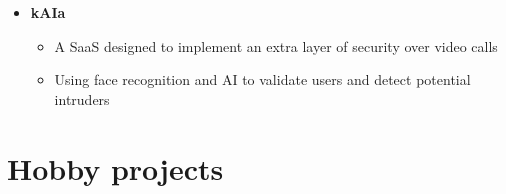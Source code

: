 \documentclass[letterpaper]{twentysecondcv} %
\begin{document}
{\begin{itemize}[leftmargin=0.5cm, rightmargin=0.5cm]
		      \begin{itemize}
			      \item A SaaS for showing predictions about the COVID-19 related data
			      \item The client was a team of doctors and researchers
			      \item Predictions were statistics based on the client-provided data
		      \end{itemize}
		\item \vspace{1em} \textbf{kAIa} \vspace{0.5em}
		      \begin{itemize}
			      \item A SaaS designed to implement an extra layer of security over video calls
			      \item Using face recognition and AI to validate users and detect potential intruders
		      \end{itemize}
	\end{itemize}}

\newpage


\section{Hobby projects}
\end{document}
